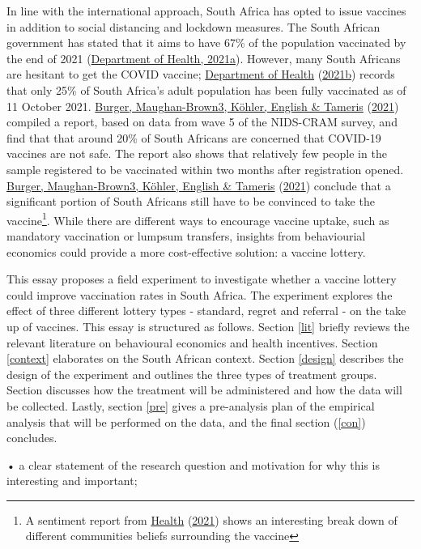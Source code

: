 \documentclass[11pt,preprint, authoryear]{elsarticle}
\numberwithin{equation}{section}
\numberwithin{figure}{section}
\numberwithin{table}{section}
\let\rmarkdownfootnote\footnote%
\def\footnote{\protect\rmarkdownfootnote}
\begin{document}
In line with the international approach, South Africa has opted to issue
vaccines in addition to social distancing and lockdown measures. The
South African government has stated that it aims to have 67\% of the
population vaccinated by the end of 2021
(\protect\hyperlink{ref-herd}{Department of Health, 2021a}). However,
many South Africans are hesitant to get the COVID vaccine;
\protect\hyperlink{ref-stat}{Department of Health}
(\protect\hyperlink{ref-stat}{2021b}) records that only 25\% of South
Africa's adult population has been fully vaccinated as of 11 October
2021. \protect\hyperlink{ref-cram}{Burger, Maughan-Brown3, Köhler,
English \& Tameris} (\protect\hyperlink{ref-cram}{2021}) compiled a
report, based on data from wave 5 of the NIDS-CRAM survey, and find that
that around 20\% of South Africans are concerned that COVID-19 vaccines
are not safe. The report also shows that relatively few people in the
sample registered to be vaccinated within two months after registration
opened. \protect\hyperlink{ref-cram}{Burger, Maughan-Brown3, Köhler,
English \& Tameris} (\protect\hyperlink{ref-cram}{2021}) conclude that a
significant portion of South Africans still have to be convinced to take
the vaccine\footnote{A sentiment report from
  \protect\hyperlink{ref-dep}{Health}
  (\protect\hyperlink{ref-dep}{2021}) shows an interesting break down of
  different communities beliefs surrounding the vaccine}. While there
are different ways to encourage vaccine uptake, such as mandatory
vaccination or lumpsum transfers, insights from behaviourial economics
could provide a more cost-effective solution: a vaccine lottery.

This essay proposes a field experiment to investigate whether a vaccine
lottery could improve vaccination rates in South Africa. The experiment
explores the effect of three different lottery types - standard, regret
and referral - on the take up of vaccines. This essay is structured as
follows. Section \ref{lit} briefly reviews the relevant literature on
behavioural economics and health incentives. Section \ref{context}
elaborates on the South African context. Section \ref{design} describes
the design of the experiment and outlines the three types of treatment
groups. Section \label{treat} discusses how the treatment will be
administered and how the data will be collected. Lastly, section
\ref{pre} gives a pre-analysis plan of the empirical analysis that will
be performed on the data, and the final section (\ref{con}) concludes.

• a clear statement of the research question and motivation for why this
is interesting and important;
\end{document}
